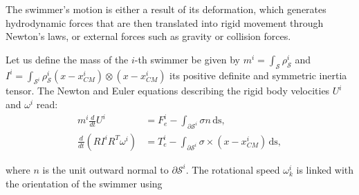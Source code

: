 \documentclass[graybox]{svmult}
\newcommand{\Real}{\mathbb{R}} %
\newcommand{\Density}{\rho} %
\newcommand{\tvel}{U} %
\newcommand{\angvel}{\omega} %
\newcommand{\Rmat}{R} %
\newcommand{\Inertia}{I} %
\newcommand{\mass}{m} %
\newcommand{\CenterMassi}{x_{CM}^i}
\newcommand{\Solid}{\mathcal{S}} %
\newcommand{\normal}{n} %
\begin{document}

The swimmer's motion is either a result of its deformation, which generates hydrodynamic forces that are then translated into rigid movement through Newton's laws, or external forces such as gravity or collision forces. 

Let us define the mass of the $i$-th swimmer be given by  $\mass^i = \int_\Solid \Density_{\Solid}^i$ %
and $\Inertia^i = \int_{\Solid^i} \Density_{\Solid}^i (x-\CenterMassi) \otimes (x-\CenterMassi)$ 
its positive definite and symmetric inertia tensor. 
The Newton and Euler equations describing the rigid body velocities $\tvel^i$ and $\angvel^i$ read:
\begin{equation}
	\begin{aligned}
		\mass^i \frac{d}{dt}\tvel^i &= F_e^i -\int_{\partial \Solid^i} \sigma \normal \,\textrm{ds},\\
		\frac{d}{dt}(\Rmat \Inertia^i \Rmat^T \angvel^i) &= T_e^i -\int_{\partial \Solid^i} \sigma \times (x-\CenterMassi)\,\textrm{ds}, 
	\end{aligned}
	\label{Eq:RB}
\end{equation}

where $\normal$ is the unit outward normal to $\partial \Solid^i$. The rotational speed $\angvel^i_k$ is linked with the orientation of the swimmer using
\end{document}
